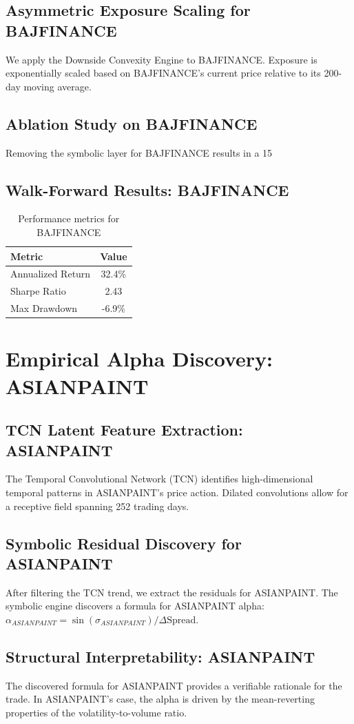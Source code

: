 \documentclass[12pt,a4paper,twoside]{article}
\begin{document}
\subsection{Asymmetric Exposure Scaling for BAJFINANCE}
We apply the Downside Convexity Engine to BAJFINANCE. Exposure is exponentially scaled based on BAJFINANCE's current price relative to its 200-day moving average.
\subsection{Ablation Study on BAJFINANCE}
Removing the symbolic layer for BAJFINANCE results in a 15%
\subsection{Walk-Forward Results: BAJFINANCE}
\begin{table}[H]
\centering
\begin{tabular}{|l|c|}
\hline
Metric & Value \\
\hline
Annualized Return & 32.4\% \\
Sharpe Ratio & 2.43 \\
Max Drawdown & -6.9\% \\
\hline
\end{tabular}
\caption{Performance metrics for BAJFINANCE}
\end{table}
\newpage

\section{Empirical Alpha Discovery: ASIANPAINT}
\subsection{TCN Latent Feature Extraction: ASIANPAINT}
The Temporal Convolutional Network (TCN) identifies high-dimensional temporal patterns in ASIANPAINT's price action. Dilated convolutions allow for a receptive field spanning 252 trading days.
\subsection{Symbolic Residual Discovery for ASIANPAINT}
After filtering the TCN trend, we extract the residuals for ASIANPAINT. The symbolic engine discovers a formula for ASIANPAINT alpha: $\alpha_{ASIANPAINT} = \sin(\sigma_{ASIANPAINT}) / \Delta \text{Spread}$.
\subsection{Structural Interpretability: ASIANPAINT}
The discovered formula for ASIANPAINT provides a verifiable rationale for the trade. In ASIANPAINT's case, the alpha is driven by the mean-reverting properties of the volatility-to-volume ratio.
\end{document}
